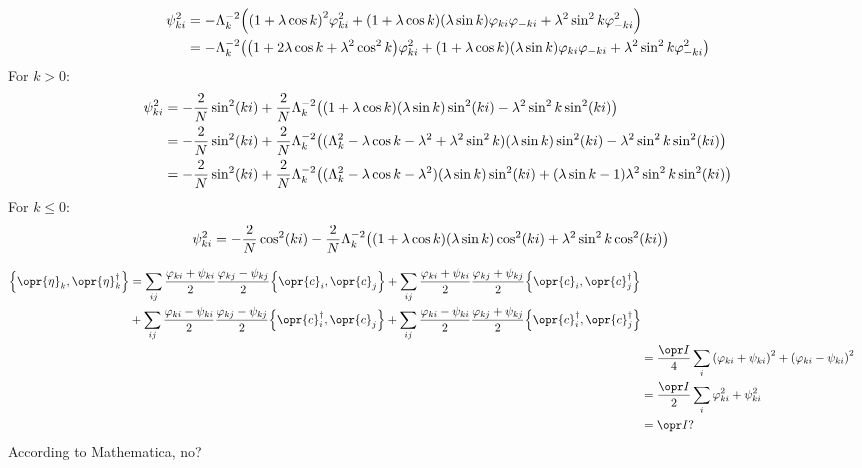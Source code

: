 \documentclass[../thesis.tex]{subfiles}
\begin{document}
\begin{align}
  \psi_{ki}^2
  &= -\Lambda_k^{-2} \qty(%
  {(1 + \lambda\cos k)}^2\varphi_{ki}^2
  + (1 + \lambda\cos k)(\lambda\sin k)\varphi_{ki}\varphi_{-ki}
  + \lambda^2\sin^2 k\varphi_{-ki}^2
  ) \\
  &= -\Lambda_k^{-2} \qty(%
  \qty(1 + 2\lambda\cos k + \lambda^2\cos^2 k)\varphi_{ki}^2
  + (1 + \lambda\cos k)(\lambda\sin k)\varphi_{ki}\varphi_{-ki}
  + \lambda^2\sin^2 k\varphi_{-ki}^2
  )
\end{align}
For $k > 0$:
\begin{align}
  \psi_{ki}^2
  &= -\frac{2}{N}\sin^2(ki)
  + \frac{2}{N}\Lambda_k^{-2}\qty(
  (1 + \lambda\cos k)(\lambda\sin k)\sin^2(ki)
  - \lambda^2\sin^2 k\sin^2(ki)
  ) \\
  &= -\frac{2}{N}\sin^2(ki)
  + \frac{2}{N}\Lambda_k^{-2}\qty(
  (\Lambda_k^2 - \lambda\cos k - \lambda^2 + \lambda^2\sin^2 k)(\lambda\sin k)\sin^2(ki)
  - \lambda^2\sin^2 k\sin^2(ki)
  ) \\
  &= -\frac{2}{N}\sin^2(ki)
  + \frac{2}{N}\Lambda_k^{-2}\qty(
  (\Lambda_k^2 - \lambda\cos k - \lambda^2)(\lambda\sin k)\sin^2(ki)
  + (\lambda\sin k - 1)\lambda^2\sin^2 k\sin^2(ki)
  ) \\
\end{align}
For $k \le 0$:
\begin{align}
  \psi_{ki}^2
  &= -\frac{2}{N}\cos^2(ki)
  - \frac{2}{N}\Lambda_k^{-2}\qty(
  (1 + \lambda\cos k)(\lambda\sin k)\cos^2(ki)
  + \lambda^2\sin^2 k\cos^2(ki)
  )
\end{align}

\begin{align}
  \begin{split}
    \acomm{\opr{\eta}_k}{\opr{\eta}_k^\dag}
  &=
  \sum_{ij}
  \frac{\varphi_{ki} + \psi_{ki}}{2}
  \frac{\varphi_{kj} - \psi_{kj}}{2}
  \acomm{\opr{c}_i}{\opr{c}_j}
  +
  \sum_{ij}
  \frac{\varphi_{ki} + \psi_{ki}}{2}
  \frac{\varphi_{kj} + \psi_{kj}}{2}
  \acomm{\opr{c}_i}{\opr{c}_j^\dag} \\
  &+
  \sum_{ij}
  \frac{\varphi_{ki} - \psi_{ki}}{2}
  \frac{\varphi_{kj} - \psi_{kj}}{2}
  \acomm{\opr{c}_i^\dag}{\opr{c}_j}
  +
  \sum_{ij}
  \frac{\varphi_{ki} - \psi_{ki}}{2}
  \frac{\varphi_{kj} + \psi_{kj}}{2}
  \acomm{\opr{c}_i^\dag}{\opr{c}_j^\dag}
  \end{split} \\
  &= \frac{\idopr}{4} \sum_{i}
  {\qty(\varphi_{ki} + \psi_{ki})}^2
  + {\qty(\varphi_{ki} - \psi_{ki})}^2
  \\
  &= \frac{\idopr}{2} \sum_{i}
  \varphi_{ki}^2 + \psi_{ki}^2
  \\
  &= \idopr?
\end{align}
According to Mathematica, no?
\end{document}
